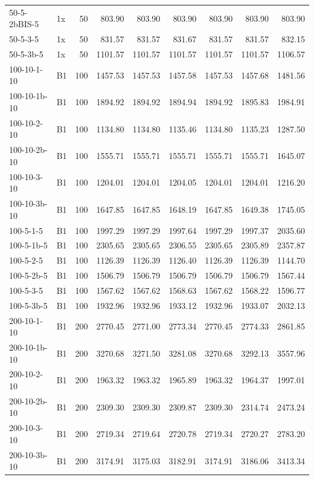\begin{longtable}{llrrrrrrr}
 50-5-2bBIS-5 & 1x & 50 & 803.90 & 803.90 & 803.90 & 803.90 & 803.90 & 803.90 \\
 50-5-3-5 & 1x & 50 & 831.57 & 831.57 & 831.67 & 831.57 & 831.57 & 832.15 \\
 50-5-3b-5 & 1x & 50 & 1101.57 & 1101.57 & 1101.57 & 1101.57 & 1101.57 & 1106.57 \\
 100-10-1-10 & B1 & 100 & 1457.53 & 1457.53 & 1457.58 & 1457.53 & 1457.68 & 1481.56 \\
 100-10-1b-10 & B1 & 100 & 1894.92 & 1894.92 & 1894.94 & 1894.92 & 1895.83 & 1984.91 \\
 100-10-2-10 & B1 & 100 & 1134.80 & 1134.80 & 1135.46 & 1134.80 & 1135.23 & 1287.50 \\
 100-10-2b-10 & B1 & 100 & 1555.71 & 1555.71 & 1555.71 & 1555.71 & 1555.71 & 1645.07 \\
 100-10-3-10 & B1 & 100 & 1204.01 & 1204.01 & 1204.05 & 1204.01 & 1204.01 & 1216.20 \\
 100-10-3b-10 & B1 & 100 & 1647.85 & 1647.85 & 1648.19 & 1647.85 & 1649.38 & 1745.05 \\
 100-5-1-5 & B1 & 100 & 1997.29 & 1997.29 & 1997.64 & 1997.29 & 1997.37 & 2035.60 \\
 100-5-1b-5 & B1 & 100 & 2305.65 & 2305.65 & 2306.55 & 2305.65 & 2305.89 & 2357.87 \\
 100-5-2-5 & B1 & 100 & 1126.39 & 1126.39 & 1126.40 & 1126.39 & 1126.39 & 1144.70 \\
 100-5-2b-5 & B1 & 100 & 1506.79 & 1506.79 & 1506.79 & 1506.79 & 1506.79 & 1567.44 \\
 100-5-3-5 & B1 & 100 & 1567.62 & 1567.62 & 1568.63 & 1567.62 & 1568.22 & 1596.77 \\
 100-5-3b-5 & B1 & 100 & 1932.96 & 1932.96 & 1933.12 & 1932.96 & 1933.07 & 2032.13 \\
 200-10-1-10 & B1 & 200 & 2770.45 & 2771.00 & 2773.34 & 2770.45 & 2774.33 & 2861.85 \\
 200-10-1b-10 & B1 & 200 & 3270.68 & 3271.50 & 3281.08 & 3270.68 & 3292.13 & 3557.96 \\
 200-10-2-10 & B1 & 200 & 1963.32 & 1963.32 & 1965.89 & 1963.32 & 1964.37 & 1997.01 \\
 200-10-2b-10 & B1 & 200 & 2309.30 & 2309.30 & 2309.87 & 2309.30 & 2314.74 & 2473.24 \\
 200-10-3-10 & B1 & 200 & 2719.34 & 2719.64 & 2720.78 & 2719.34 & 2720.27 & 2783.20 \\
 200-10-3b-10 & B1 & 200 & 3174.91 & 3175.03 & 3182.91 & 3174.91 & 3186.06 & 3413.34 \\

\end{longtable}
